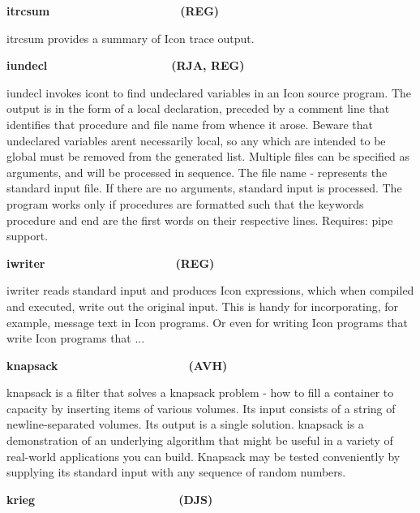 {\sffamily\bfseries
itrcsum\ \ \ \ \ \ \ \ \ \ \ \ \ \ \ \ \ \ \ \ (REG)}

\textsf{itrcsum} provides a summary of Icon trace output.

{\sffamily\bfseries
iundecl\ \ \ \ \ \ \ \ \ \ \ \ \ \ \ \ \ \  \ (RJA, REG)}

\textsf{iundecl} invokes icont to find undeclared variables in an Icon
source program. The output is in the form of a
{\textquotedbl}local{\textquotedbl} declaration, preceded by a comment
line that identifies that procedure and file name from whence it arose.
Beware that undeclared variables aren{\textquotesingle}t necessarily
local, so any which are intended to be global must be removed from the
generated list. Multiple files can be specified as arguments, and will
be processed in sequence. The file name {\textquotedbl}-{\textquotedbl}
represents the standard input file. If there are no arguments, standard
input is processed. The program works only if procedures are formatted
such that the keywords {\textquotedbl}procedure{\textquotedbl} and
{\textquotedbl}end{\textquotedbl} are the first words on their
respective lines. Requires: pipe support.

{\sffamily\bfseries
iwriter\ \ \ \ \ \ \ \ \ \ \ \ \ \ \ \ \ \ \ \ (REG)}

\textsf{iwriter} reads standard input and produces Icon expressions,
which when compiled and executed, write out the original input. This is
handy for incorporating, for example, message text in Icon programs. Or
even for writing Icon programs that write Icon programs that ... 

{\sffamily\bfseries
knapsack\ \ \ \ \ \ \ \ \ \ \ \ \ \ \ \ \ \ \ \ (AVH)}

\textsf{knapsack} is a filter that solves a knapsack problem - how to
fill a container to capacity by inserting items of various volumes. Its
input consists of a string of newline-separated volumes. Its output is
a single solution. knapsack is a demonstration of an underlying
algorithm that might be useful in a variety of real-world applications
you can build. Knapsack may be tested conveniently by supplying its
standard input with any sequence of random numbers. 

{\sffamily\bfseries
krieg\ \ \ \ \ \ \ \ \ \ \ \ \ \ \ \ \ \ \ \ \ \ (DJS)}

